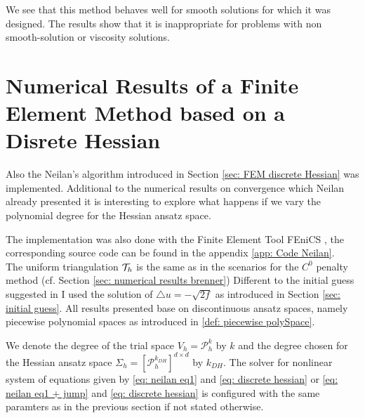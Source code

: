 
We see that this method behaves well for smooth solutions for which it was designed. The results show that it is inappropriate for problems with non smooth-solution or viscosity solutions.

\section{Numerical Results of a Finite Element Method based on a Disrete Hessian}

Also the Neilan's algorithm \cite{Neilan2014} introduced in Section \ref{sec: FEM discrete Hessian} was implemented.
Additional to the numerical results on convergence which Neilan already presented it is interesting to explore what happens if we vary the polynomial degree for the Hessian ansatz space. 

The implementation was also done with the Finite Element Tool FEniCS \cite{FEniCS}, the corresponding source code can be found in the appendix \ref{app: Code Neilan}. \\
The uniform triangulation $\mathcal{T}_h$ is the same as in the scenarios for the $C^0$ penalty method (cf. Section \ref{sec: numerical results brenner})
Different to the initial guess suggested in \cite{Neilan2014} I used the solution of $\triangle u = -\sqrt{2f}$ as introduced in Section \ref{sec: initial guess}. All results presented base on discontinuous ansatz spaces, namely piecewise polynomial spaces as introduced in \ref{def: piecewise polySpace}.

We denote the degree of the trial space $V_h=\mathcal P_h^k$ by $k$ and the degree chosen for the Hessian ansatz space $\Sigma_h = [\mathcal{P}_h^{k_{DH}}]^{d \times d}$ by $k_{DH}$. The solver for nonlinear system of equations given by \eqref{eq: neilan eq1} and \eqref{eq: discrete hessian} or \eqref{eq: neilan eq1 + jump} and \eqref{eq: discrete hessian} is configured with the same paramters as in the previous section if not stated otherwise. 










